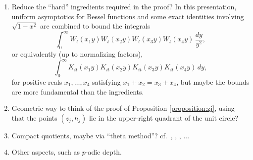 \documentclass[reqno]{amsart} 
\begin{document}
\begin{enumerate}
\item Reduce the ``hard'' ingredients required in the proof?  In this presentation, uniform asymptotics for Bessel functions and some exact identities involving $\sqrt{1 - x^2}$ are combined to bound the integrals
  \begin{equation*}
    \int_0 ^\infty W _t (x _1 y) W _t (x _2 y ) W _t (x _3 y) W _t (x _4 y) \, \frac{d y}{y^2},
  \end{equation*}
  or equivalently (up to normalizing factors),
  \begin{equation*}
    \int_0 ^\infty K_{it} (x _1 y) K_{it} (x _2 y ) K_{it} (x _3 y) K_{it} (x _4 y) \, d y,
  \end{equation*}
  for positive reals $x_1, \dotsc, x_4$ satisfying $x_1 + x_2 = x_3 + x_4$, but maybe the bounds are more fundamental than the ingredients.
\item Geometric way to think of the proof of Proposition \ref{proposition:zj}, using that the points $(z_j, h_j)$ lie in the upper-right quadrant of the unit circle?
\item Compact quotients, maybe via ``theta method''?  cf.\ \cite{2012arXiv1210.1243N}, \cite{nelson-variance-3}, \cite{MR4752128}, ...
\item Other aspects, such as $p$-adic depth.
\end{enumerate}




{} 
\end{document}
